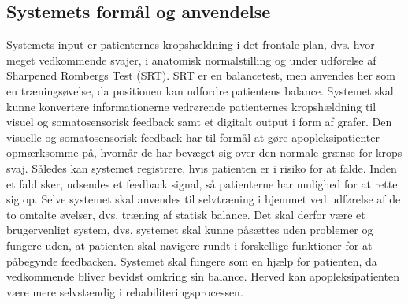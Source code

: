 \subsection{Systemets formål og anvendelse}
Systemets input er patienternes kropshældning i det frontale plan, dvs. hvor meget vedkommende svajer, i anatomisk normalstilling og under udførelse af Sharpened Rombergs Test (SRT). SRT er en balancetest, men anvendes her som en træningsøvelse, da positionen kan udfordre patientens balance. Systemet skal kunne konvertere informationerne vedrørende patienternes kropshældning til visuel og somatosensorisk feedback samt et digitalt output i form af grafer. Den visuelle og somatosensorisk feedback har til formål at gøre apopleksipatienter opmærksomme på, hvornår de har bevæget sig over den normale grænse for krops svaj. Således kan systemet registrere, hvis patienten er i risiko for at falde. Inden et fald sker, udsendes et feedback signal, så patienterne har mulighed for at rette sig op. Selve systemet skal anvendes til selvtræning i hjemmet ved udførelse af de to omtalte øvelser, dvs. træning af statisk balance. Det skal derfor være et brugervenligt system, dvs. systemet skal kunne påsættes uden problemer og fungere uden, at patienten skal navigere rundt i forskellige funktioner for at påbegynde feedbacken. Systemet skal fungere som en hjælp for patienten, da vedkommende bliver bevidst omkring sin balance. Herved kan apopleksipatienten være mere selvstændig i rehabiliteringsprocessen.

